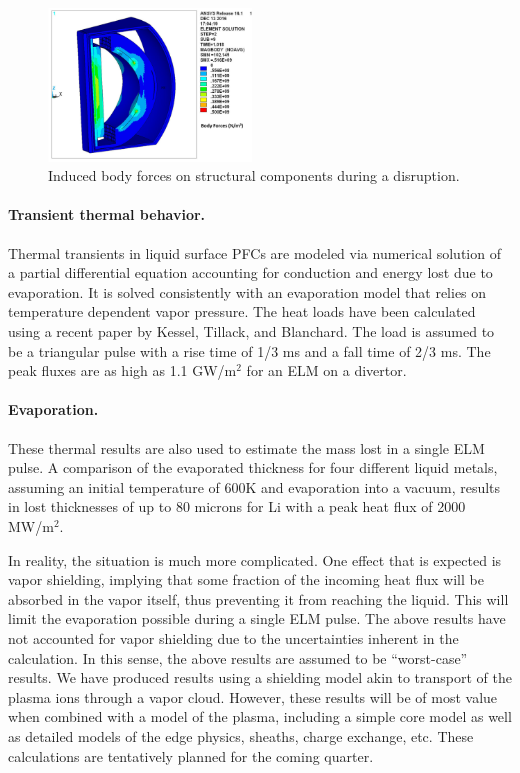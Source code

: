 \begin{figure}
\centering
\includegraphics[width=0.48\textwidth]{imgs/disrupt-em.png}
\caption{\label{fig:disrupt-em}Induced body forces on structural components during a disruption.}
\end{figure}

\paragraph{Transient thermal behavior.} Thermal transients in liquid surface
\glspl{PFC} are modeled via numerical solution of a partial differential
equation accounting for conduction and energy lost due to evaporation. It is
solved consistently with an evaporation model that relies on temperature
dependent vapor pressure. The heat loads have been calculated using a recent
paper by Kessel, Tillack, and Blanchard. The load is assumed to be a
triangular pulse with a rise time of 1/3 ms and a fall time of 2/3 ms. The peak
fluxes are as high as 1.1 GW/m$^2$ for an \gls{ELM} on a divertor.

\paragraph{Evaporation.} These thermal results are also used to estimate
the mass lost in a single \gls{ELM} pulse. A comparison of the evaporated
thickness for four different liquid metals, assuming an initial temperature of
600K and evaporation into a vacuum, results in lost thicknesses of up to 80
microns for Li with a peak heat flux of 2000 MW/m$^2$.

In reality, the situation is much more complicated. One effect that is
expected is vapor shielding, implying that some fraction of the incoming heat
flux will be absorbed in the vapor itself, thus preventing it from reaching
the liquid. This will limit the evaporation possible during a single \gls{ELM}
pulse. The above results have not accounted for vapor shielding due to the
uncertainties inherent in the calculation. In this sense, the above results
are assumed to be “worst-case” results. We have produced results using a
shielding model akin to transport of the plasma ions through a vapor
cloud. However, these results will be of most value when combined with a model
of the plasma, including a simple core model as well as detailed models of the
edge physics, sheaths, charge exchange, etc. These calculations are
tentatively planned for the coming quarter.

